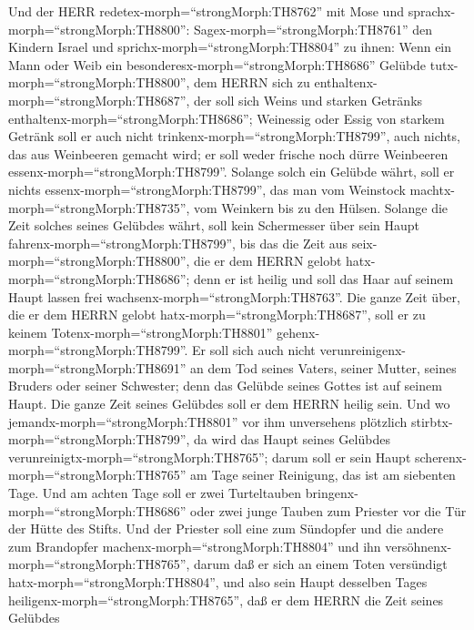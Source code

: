  Und der HERR redetex-morph=``strongMorph:TH8762'' mit Mose
und sprachx-morph=``strongMorph:TH8800'': 
Sagex-morph=``strongMorph:TH8761'' den Kindern Israel und
sprichx-morph=``strongMorph:TH8804'' zu ihnen: Wenn ein Mann oder Weib
ein besonderesx-morph=``strongMorph:TH8686'' Gelübde
tutx-morph=``strongMorph:TH8800'', dem HERRN sich zu
enthaltenx-morph=``strongMorph:TH8687'',  der soll sich
Weins und starken Getränks enthaltenx-morph=``strongMorph:TH8686'';
Weinessig oder Essig von starkem Getränk soll er auch nicht
trinkenx-morph=``strongMorph:TH8799'', auch nichts, das aus Weinbeeren
gemacht wird; er soll weder frische noch dürre Weinbeeren
essenx-morph=``strongMorph:TH8799''.  Solange solch ein
Gelübde währt, soll er nichts essenx-morph=``strongMorph:TH8799'', das
man vom Weinstock machtx-morph=``strongMorph:TH8735'', vom Weinkern bis
zu den Hülsen.  Solange die Zeit solches seines Gelübdes
währt, soll kein Schermesser über sein Haupt
fahrenx-morph=``strongMorph:TH8799'', bis das die Zeit aus
seix-morph=``strongMorph:TH8800'', die er dem HERRN gelobt
hatx-morph=``strongMorph:TH8686''; denn er ist heilig und soll das Haar
auf seinem Haupt lassen frei wachsenx-morph=``strongMorph:TH8763''.
 Die ganze Zeit über, die er dem HERRN gelobt
hatx-morph=``strongMorph:TH8687'', soll er zu keinem
Totenx-morph=``strongMorph:TH8801'' gehenx-morph=``strongMorph:TH8799''.
 Er soll sich auch nicht
verunreinigenx-morph=``strongMorph:TH8691'' an dem Tod seines Vaters,
seiner Mutter, seines Bruders oder seiner Schwester; denn das Gelübde
seines Gottes ist auf seinem Haupt.  Die ganze Zeit seines
Gelübdes soll er dem HERRN heilig sein.  Und wo
jemandx-morph=``strongMorph:TH8801'' vor ihm unversehens plötzlich
stirbtx-morph=``strongMorph:TH8799'', da wird das Haupt seines Gelübdes
verunreinigtx-morph=``strongMorph:TH8765''; darum soll er sein Haupt
scherenx-morph=``strongMorph:TH8765'' am Tage seiner Reinigung, das ist
am siebenten Tage.  Und am achten Tage soll er zwei
Turteltauben bringenx-morph=``strongMorph:TH8686'' oder zwei junge
Tauben zum Priester vor die Tür der Hütte des Stifts.  Und
der Priester soll eine zum Sündopfer und die andere zum Brandopfer
machenx-morph=``strongMorph:TH8804'' und ihn
versöhnenx-morph=``strongMorph:TH8765'', darum daß er sich an einem
Toten versündigt hatx-morph=``strongMorph:TH8804'', und also sein Haupt
desselben Tages heiligenx-morph=``strongMorph:TH8765'', 
daß er dem HERRN die Zeit seines Gelübdes
